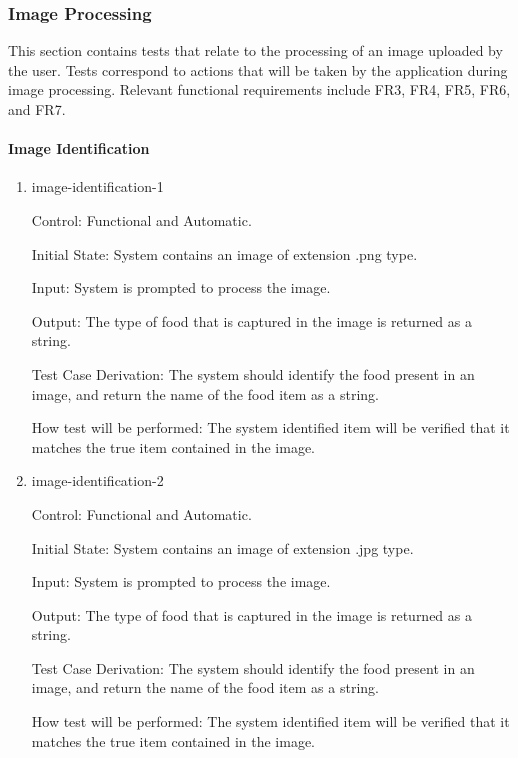 \documentclass[12pt, titlepage]{article}
\begin{document}
	\subsubsection{Image Processing}
	This section contains tests that relate to the processing of an image 
	uploaded by the user. Tests correspond to actions that will be taken by the 
	application during image processing. Relevant functional requirements 
	include FR3, FR4, FR5, FR6, and FR7.
	
	\paragraph{Image Identification}
	
	\begin{enumerate}
		
		\item{image-identification-1\\}
		
		Control: Functional and Automatic.
		
		Initial State: System contains an image of extension .png type.
		
		Input: System is prompted to process the image.
		
		Output: The type of food that is captured in the image is returned as a 
		string.
		
		Test Case Derivation: The system should identify the food present in an 
		image, and return the name of the food item as a string.
		
		How test will be performed: The system identified item will be verified 
		that it matches the true item contained in the image.
		
		\item{image-identification-2\\}
		
		Control: Functional and Automatic.
		
		Initial State: System contains an image of extension .jpg type.
		
		Input: System is prompted to process the image.
		
		Output: The type of food that is captured in the image is returned as a 
		string.
		
		Test Case Derivation: The system should identify the food present in an 
		image, and return the name of the food item as a string.
		
		How test will be performed: The system identified item will be verified 
		that it matches the true item contained in the image.
		

\end{enumerate}
\end{document}
